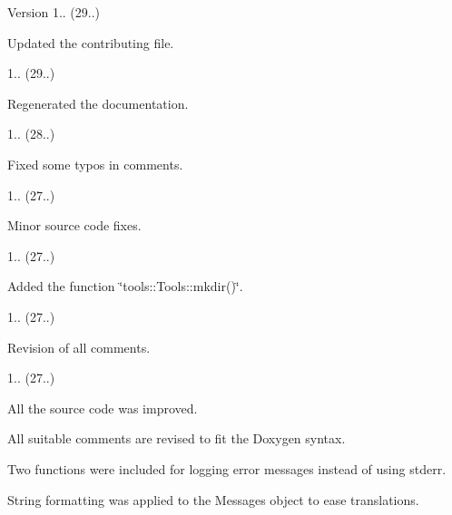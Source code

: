 \begin{DoxyVersion}{Version}
1.. (29..)
\begin{DoxyItemize}
\item Updated the contributing file. 
\end{DoxyItemize}

1.. (29..)
\begin{DoxyItemize}
\item Regenerated the documentation. 
\end{DoxyItemize}

1.. (28..)
\begin{DoxyItemize}
\item Fixed some typos in comments. 
\end{DoxyItemize}

1.. (27..)
\begin{DoxyItemize}
\item Minor source code fixes. 
\end{DoxyItemize}

1.. (27..)
\begin{DoxyItemize}
\item Added the function \char`\"{}tools\+::\+Tools\+::mkdir()\char`\"{}. 
\end{DoxyItemize}

1.. (27..)
\begin{DoxyItemize}
\item Revision of all comments. 
\end{DoxyItemize}

1.. (27..)
\begin{DoxyItemize}
\item All the source code was improved.
\item All suitable comments are revised to fit the Doxygen syntax.
\item Two functions were included for logging error messages instead of using stderr.
\item String formatting was applied to the Messages object to ease translations. 
\end{DoxyItemize}
\end{DoxyVersion}
